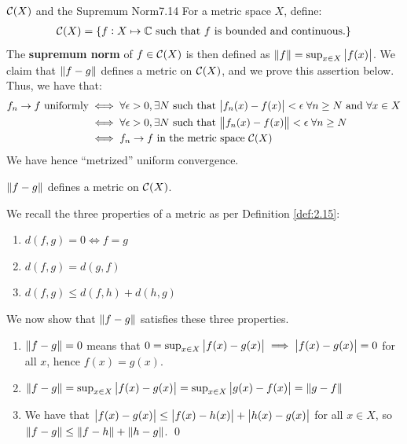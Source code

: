 \begin{definition}{$\mathcal{C}(X)$ and the Supremum Norm}{7.14}
    For a metric space $X$, define:
    \begin{align*}
        \mathcal{C}(X) = \set{f: X \mapsto \mathbb{C}\text{ such that $f$ is bounded and continuous.}}
    \end{align*}
    The \textbf{supremum norm} of $f \in \mathcal{C}(X)$ is then defined as $\norm{f} = \sup_{x \in X}\abs{f(x)}$. We claim that $\norm{f - g}$ defines a metric on $\mathcal{C}(X)$, and we prove this assertion below. Thus, we have that:
    \begin{align*}
        f_n \rightarrow f \text{ uniformly} &\iff \forall \epsilon > 0, \exists N \text{ such that } \abs{f_n(x) - f(x)} < \epsilon \; \forall n \geq N \text{ and } \forall x \in X
        \\ &\iff \forall \epsilon > 0, \exists N \text{ such that } \norm{f_n(x) - f(x)} < \epsilon \; \forall n \geq N
        \\ &\iff f_n \rightarrow f \text{ in the metric space $\mathcal{C}(X)$}
    \end{align*}
    We have hence ``metrized'' uniform convergence.
\end{definition}
\begin{ntheorem}{}{}
    $\norm{f - g}$ defines a metric on $\mathcal{C}(X)$.
\end{ntheorem}
\begin{nproof}
    We recall the three properties of a metric as per Definition \ref{def:2.15}:
    \begin{enumerate}
        \item $d(f, g) = 0 \iff f = g$
        \item $d(f, g) = d(g, f)$
        \item $d(f, g) \leq d(f, h) + d(h, g)$
    \end{enumerate}
    We now show that $\norm{f - g}$ satisfies these three properties.
    \begin{enumerate}
        \item $\norm{f - g} = 0$ means that $0 = \sup_{x \in X}\abs{f(x) - g(x)} \implies \abs{f(x) - g(x)} = 0$ for all $x$, hence $f(x) = g(x)$. 
        \item $\norm{f - g} = \sup_{x \in X}\abs{f(x) - g(x)} = \sup_{x \in X}\abs{g(x) - f(x)} = \norm{g - f}$
        \item We have that $\abs{f(x) - g(x)} \leq \abs{f(x) - h(x)} + \abs{h(x) - g(x)}$ for all $x \in X$, so $\norm{f - g} \leq \norm{f - h} + \norm{h - g}$. \qed
    \end{enumerate}
\end{nproof}

